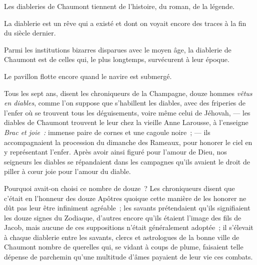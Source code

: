 \documentclass[french,twoside]{book} %
\newenvironment{quoteblock}%
  {\begin{quoting}}
  {\end{quoting}}
\newenvironment{quotebar}{%
    \def\FrameCommand{{\color{rubric!10!}\vrule width 0.5em} \hspace{0.9em}}%
    \def\OuterFrameSep{\itemsep} %
    \MakeFramed {\advance\hsize-\width \FrameRestore}
  }%
  {%
    \endMakeFramed
  }
\renewenvironment{quoteblock}%
  {%
    \savenotes
    \setstretch{0.9}
    \normalfont
    \begin{quotebar}
  }
  {%
    \end{quotebar}
    \spewnotes
  }
\begin{document}
\begin{quoteblock}
 \noindent Les diableries de Chaumont tiennent de l’histoire, du roman, de la légende.\par
 La diablerie est un rêve qui a existé et dont on voyait encore des traces à la fin du siècle dernier.\par
 Parmi les institutions bizarres disparues avec le moyen âge, la diablerie de Chaumont est de celles qui, le plus longtemps, survécurent à leur époque.\par
 Le pavillon flotte encore quand le navire est submergé.\par
 Tous les sept ans, disent les chroniqueurs de la Champagne, douze hommes \emph{vêtus en diables}, comme l’on suppose que s’habillent les diables, avec des friperies de l’enfer où se trouvent tous les déguisements, voire même celui de Jéhovah, — les diables de Chaumont trouvent le leur chez la vieille Anne Larousse, à l’enseigne \emph{Brac et joie :} immense paire de cornes et une cagoule noire ; — ils accompagnaient la procession du dimanche des Rameaux, pour honorer le ciel en y représentant l’enfer. Après avoir ainsi figuré pour l’amour de Dieu, nos seigneurs les diables se répandaient dans les campagnes qu’ils avaient le droit de piller à cœur joie pour l’amour du diable.\par
 Pourquoi avait-on choisi ce nombre de douze ? Les chroniqueurs  disent que c’était en l’honneur des douze Apôtres quoique cette manière de les honorer ne dût pas leur être infiniment agréable ; les savants prétendaient qu’ils signifiaient les douze signes du Zodiaque, d’autres encore qu’ils étaient l’image des fils de Jacob, mais aucune de ces suppositions n’était généralement adoptée ; il s’élevait à chaque diablerie entre les savants, clercs et astrologues de la bonne ville de Chaumont nombre de querelles qui, se vidant à coups de plume, faisaient telle dépense de parchemin qu’une multitude d’âmes payaient de leur vie ces combats.
 \end{quoteblock}
\end{document}
